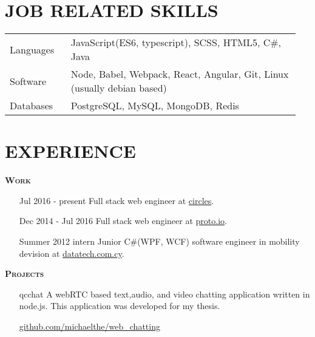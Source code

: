 \documentclass[margin, 10pt]{res} %
\begin{document}
\begin{resume}
\begin{tabular}{p{0.2\linewidth} p{0.75\linewidth}}
\end{tabular}

\section{JOB RELATED SKILLS}

\begin{tabular}{p{0.2\linewidth} p{0.75\linewidth}}

Languages & JavaScript(ES6, typescript), SCSS, HTML5, C\#, Java \\
Software & Node, Babel, Webpack, React, Angular, Git, Linux (usually debian based) \\
Databases & PostgreSQL, MySQL, MongoDB, Redis

\end{tabular}

\section{EXPERIENCE}

\textsc{ \textbf{Work}}

\begin{itemize}

\item[Jul 2016 - present] Full stack web engineer at
\href{http://circles.bz}{circles}. \\

\item[Dec 2014 - Jul 2016] Full stack web engineer at
\href{https://proto.io/}{proto.io}. \\

\item[Summer 2012 intern] Junior C\#(WPF, WCF) software engineer in mobility devision at
\href{http://www.datatech.com.cy/}{datatech.com.cy}. \\

\end{itemize}

\textsc{ \textbf{Projects}}

\begin{itemize}

\item[qcchat] A webRTC based text,audio, and video chatting application written in node.js.
This application was developed for my thesis.

\href{https://github.com/michaelthe/web_chatting}{github.com/michaelthe/web\_chatting} \\


\end{itemize}
\end{resume}
\end{document}
